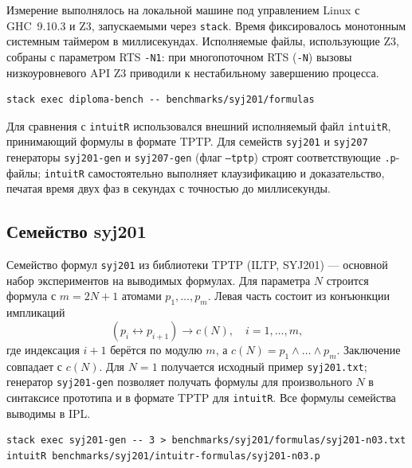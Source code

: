 \documentclass[14pt, russian]{scrartcl}
\begin{document}
Измерение выполнялось на локальной машине под управлением Linux с GHC~9.10.3 и
Z3, запускаемыми через \texttt{stack}. Время фиксировалось монотонным
системным таймером в миллисекундах. Исполняемые файлы, использующие Z3, собраны
с параметром RTS \texttt{-N1}: при многопоточном RTS (\texttt{-N}) вызовы
низкоуровневого API Z3 приводили к нестабильному завершению процесса.

\begin{listing}[!htb]
\caption{Запуск бенчмарка разработанного доказателя}
\label{lst:benchmark-command}
\begin{verbatim}
stack exec diploma-bench -- benchmarks/syj201/formulas
\end{verbatim}
\end{listing}

Для сравнения с \texttt{intuitR} использовался внешний исполняемый файл
\texttt{intuitR}, принимающий формулы в формате TPTP. Для семейств
\texttt{syj201} и \texttt{syj207} генераторы \texttt{syj201-gen} и
\texttt{syj207-gen} (флаг \texttt{---tptp}) строят соответствующие
\texttt{.p}-файлы; \texttt{intuitR} самостоятельно выполняет клаузификацию и
доказательство, печатая время двух фаз в секундах с точностью до миллисекунды.

\subsection{Семейство syj201}

Семейство формул \texttt{syj201} из библиотеки TPTP (ILTP, SYJ201) --- основной
набор экспериментов на выводимых формулах. Для параметра $N$ строится формула
с $m = 2N + 1$ атомами $p_1, \ldots, p_m$. Левая часть состоит из конъюнкции
импликаций
\[
  (p_i \leftrightarrow p_{i+1}) \rightarrow c(N), \quad i = 1, \ldots, m,
\]
где индексация $i+1$ берётся по модулю $m$, а $c(N) = p_1 \land \ldots \land p_m$.
Заключение совпадает с $c(N)$. Для $N = 1$ получается исходный пример
\texttt{syj201.txt}; генератор \texttt{syj201-gen} позволяет получать формулы
для произвольного $N$ в синтаксисе прототипа и в формате TPTP для
\texttt{intuitR}. Все формулы семейства выводимы в IPL.

\begin{listing}[!htb]
\caption{Генерация семейства syj201 и запуск intuitR}
\label{lst:syj201-gen-intuitr}
\begin{verbatim}
stack exec syj201-gen -- 3 > benchmarks/syj201/formulas/syj201-n03.txt
intuitR benchmarks/syj201/intuitr-formulas/syj201-n03.p
\end{verbatim}
\end{listing}
\end{document}
